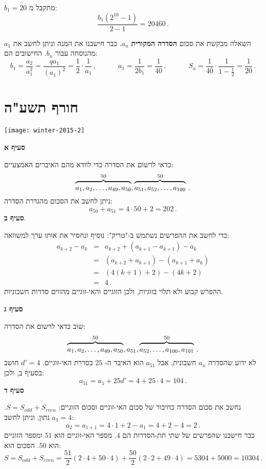 $b_1=20$
מתקבל מ:
\[
\frac{b_1(2^{10}-1)}{2-1}=20460\,.
\]

השאלה מבקשת את סכום 
\textbf{הסדרה המקורית}
$a_{n}$.
כבר חישבנו את המנה וניתן לחשב את
$a_1$
מהנוסחה עבור 
$b_n$.
החישובים הם:
\[
b_1 = \frac{a_2}{a_1^2} = \frac{qa_1}{(a_1)^2} = \frac{1}{2}\cdot\frac{1}{a_1}\,,\quad\quad\quad a_1=\frac{1}{2b_1}=\frac{1}{40}\,,\quad\quad\quad S_a = \frac{1}{40}\cdot\frac{1}{1-\frac{1}{2}} = \frac{1}{20}\,.
\]


\np
\section{חורף תשע"ה}

\begin{center}
\texttt{[image: winter-2015-2]}
\end{center}
\vspace{-1ex}

\textbf{סעיף א}

כדאי לרשום את הסדרה כדי לוודא מהם האיברים האמצעיים:
\[
\overbrace{\rule{0pt}{8pt}a_1, a_2, \ldots, a_{49}, a_{50}}^{50}, \overbrace{\rule{0pt}{8pt}a_{51}, a_{52},\ldots, a_{100}}^{50}\,.
\]
ניתן לחשב את הסכום מהגדרת הסדרה:
\[
a_{50}+a_{51}=4\cdot 50+2=202\,.
\]
\textbf{סעיף ב}.

כדי לחשב את ההפרשים נשתמש ב-"טריק": נוסיף ונחסיר את אותו ערך למשוואה:
\begin{eqnarray*}
a_{k+2} - a_{k} &=& a_{k+2}+(a_{k+1}-a_{k+1})-a_{k}\\
&=& (a_{k+2}+a_{k+1})-(a_{k+1}+a_{k})\\
&=& (4(k+1)+2)-(4k+2)\\
&=&4\,.
\end{eqnarray*}
ההפרש קבוע ולא תלוי בזוגיות, ולכן הזוגיים והאי-זוגיים מהווים סדרות חשבוניות.

\textbf{סעיף ג}

שוב כדאי לרשום את הסדרה:
\[
\overbrace{\rule{0pt}{8pt}a_1, a_2, \ldots, a_{49}, a_{50}}^{50}, a_{51}, \overbrace{\rule{0pt}{8pt}a_{52}, \ldots, a_{100}, a_{101}}^{50}\,.
\]
לא ידוע שהסדרה
$a_{n}$
חשבונית, אבל
$a_{51}$
הוא האיבר ה-%
$25$
בסדרת האי-זוגיים.
$d'=4$
חושב בסעיף ב, ולכן:
\[
a_{51}=a_1+25d' =4+25\cdot 4=104\,.
\]
\textbf{סעיף ד}

נחשב את סכום הסדרה כחיבור של סכום האי-זוגיים וסכום הזוגיים:
$S=S_{\mathit{odd}} + S_{\mathit{even}}$.
$a_1=4$
נתון, וניתן לחשב:
\[
a_2=a_{1+1}=4\cdot 1+2-a_1=4+2-4=2\,.
\]
כבר חישבנו שהפרשים של שתי תת-הסדרות הם 
$4$.
מספר האי-זוגיים הוא
$51$
ומספר הזוגיים הוא
$50$.
הסכום הוא:
\[
S=S_{\mathit{odd}} + S_{\mathit{even}}=\frac{51}{2}(2\cdot 4+50\cdot 4)+\frac{50}{2}(2\cdot 2+49\cdot 4)=5304+5000=10304\,.
\]

